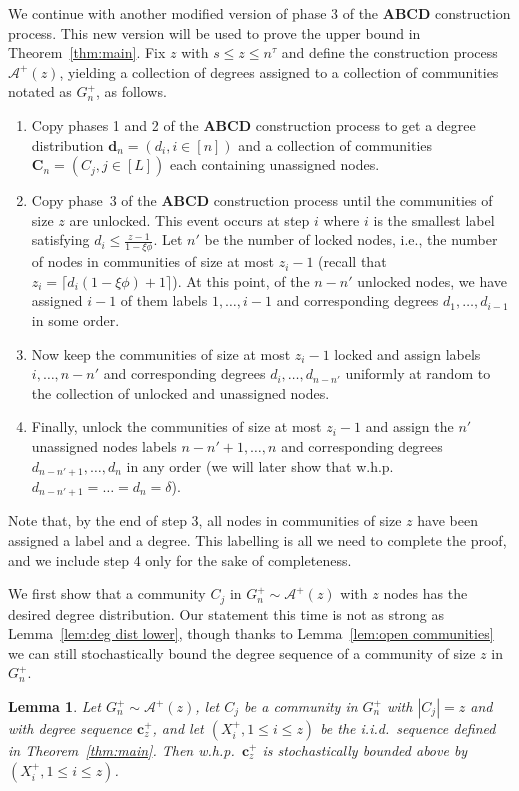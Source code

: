 \documentclass[12pt]{article}
\newtheorem{lemma}[theorem]{Lemma}
\theoremstyle{definition}
\theoremstyle{remark}
\theoremstyle{remark}
\numberwithin{theorem}{section}
\newcommand{\abcdUpper}{\ensuremath{\mathcal{A}^+(z)}}
\begin{document}
We continue with another modified version of phase 3 of the \textbf{ABCD} construction process. This new version will be used to prove the upper bound in Theorem~\ref{thm:main}. Fix $z$ with $s \leq z \leq n^\tau$ and define the construction process $\abcdUpper$, yielding a collection of degrees assigned to a collection of communities notated as $G_n^+$, as follows. 
\begin{enumerate}
\item Copy phases 1 and 2 of the \textbf{ABCD} construction process to get a degree distribution $\textbf{d}_n = (d_i, i \in [n])$ and a collection of communities $\textbf{C}_n = (C_j, j \in [L])$ each containing unassigned nodes. 
\item Copy phase~3 of the \textbf{ABCD} construction process until the communities of size $z$ are unlocked. This event occurs at step $i$ where $i$ is the smallest label satisfying $d_i \leq \frac{z-1}{1-\xi \phi}$. Let $n'$ be the number of locked nodes, i.e., the number of nodes in communities of size at most $z_i-1$ (recall that $z_i = \lceil d_i(1-\xi \phi) + 1 \rceil$). At this point, of the $n-n'$ unlocked nodes, we have assigned $i-1$ of them labels $1,\dots, i-1$ and corresponding degrees $d_1,\dots, d_{i-1}$ in some order. 
\item Now keep the communities of size at most $z_i-1$ locked and assign labels $i,\dots,n-n'$ and corresponding degrees $d_i,\dots,d_{n-n'}$ uniformly at random to the collection of unlocked and unassigned nodes. 
\item Finally, unlock the communities of size at most $z_i-1$ and assign the $n'$ unassigned nodes labels $n-n'+1,\dots,n$ and corresponding degrees $d_{n-n'+1},\dots,d_n$ in any order (we will later show that w.h.p.\ $d_{n-n'+1} = \dots = d_n = \delta$).
\end{enumerate}
Note that, by the end of step 3, all nodes in communities of size $z$ have been assigned a label and a degree. This labelling is all we need to complete the proof, and we include step 4 only for the sake of completeness.

We first show that a community $C_j$ in $G_n^+ \sim \abcdUpper$ with $z$ nodes has the desired degree distribution. Our statement this time is not as strong as Lemma~\ref{lem:deg dist lower}, though thanks to Lemma~\ref{lem:open communities} we can still stochastically bound the degree sequence of a community of size $z$ in $G_n^+$.
\begin{lemma}\label{lem:deg dist upper}
Let $G_n^+ \sim \abcdUpper$, let $C_j$ be a community in $G_n^+$ with $|C_j| = z$ and with degree sequence $\mathbf{c}_z^+$, and let $(X_i^+, 1 \leq i \leq z)$ be the i.i.d.\ sequence defined in Theorem~\ref{thm:main}. Then w.h.p.\ $\mathbf{c}_z^+$ is stochastically bounded above by $(X_i^+, 1 \leq i \leq z)$. 
\end{lemma}
\end{document}
